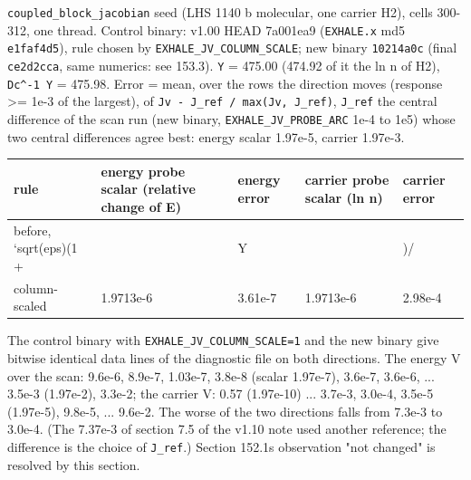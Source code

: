 \documentclass[english,a4paper]{my_memo}
\begin{document}
\texttt{coupled\_block\_jacobian} seed (LHS 1140 b molecular, one carrier H2), cells 300-312, one thread. Control binary: v1.00 HEAD 7a001ea9 (\texttt{EXHALE.x} md5 \texttt{e1faf4d5}), rule chosen by \texttt{EXHALE\_JV\_COLUMN\_SCALE}; new binary \texttt{10214a0c} (final \texttt{ce2d2cca}, same numerics: see 153.3). \texttt{\textbar{}\textbar{}Y\textbar{}\textbar{}} = 475.00 (474.92 of it the ln n of H2), \texttt{\textbar{}\textbar{}Dc\^{}-1\ Y\textbar{}\textbar{}} = 475.98. Error = mean, over the rows the direction moves (response \textgreater= 1e-3 of the largest), of \texttt{\textbar{}Jv\ -\ J\_ref\textbar{}\ /\ max(\textbar{}Jv\textbar{},\ \textbar{}J\_ref\textbar{})}, \texttt{J\_ref} the central difference of the scan run (new binary, \texttt{EXHALE\_JV\_PROBE\_ARC} 1e-4 to 1e5) whose two central differences agree best: energy scalar 1.97e-5, carrier 1.97e-3.

{\def\LTcaptype{none} %
{\small
\begin{longtable}[]{@{}>{\raggedright\arraybackslash}p{\dimexpr(\linewidth-10\tabcolsep)/5\relax}>{\raggedright\arraybackslash}p{\dimexpr(\linewidth-10\tabcolsep)/5\relax}>{\raggedright\arraybackslash}p{\dimexpr(\linewidth-10\tabcolsep)/5\relax}>{\raggedright\arraybackslash}p{\dimexpr(\linewidth-10\tabcolsep)/5\relax}>{\raggedright\arraybackslash}p{\dimexpr(\linewidth-10\tabcolsep)/5\relax}@{}}
\toprule\noalign{}
rule & energy probe scalar (relative change of E) & energy error & carrier probe scalar (ln n) & carrier error \\
\midrule\noalign{}
\endhead
\bottomrule\noalign{}
\endlastfoot
before, `sqrt(eps)(1 + & & Y & & )/ \\
column-scaled & 1.9713e-6 & 3.61e-7 & 1.9713e-6 & 2.98e-4 \\
\end{longtable}
}
}

The control binary with \texttt{EXHALE\_JV\_COLUMN\_SCALE=1} and the new binary give bitwise identical data lines of the diagnostic file on both directions. The energy V over the scan: 9.6e-6, 8.9e-7, 1.03e-7, 3.8e-8 (scalar 1.97e-7), 3.6e-7, 3.6e-6, ... 3.5e-3 (1.97e-2), 3.3e-2; the carrier V: 0.57 (1.97e-10) ... 3.7e-3, 3.0e-4, 3.5e-5 (1.97e-5), 9.8e-5, ... 9.6e-2. The worse of the two directions falls from 7.3e-3 to 3.0e-4. (The 7.37e-3 of section 7.5 of the v1.10 note used another reference; the difference is the choice of \texttt{J\_ref}.) Section 152.1\textquotesingle s observation "not changed" is resolved by this section.
\end{document}
